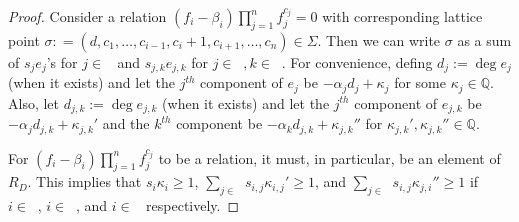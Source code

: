 \documentclass{amsart}
\theoremstyle{plain}
\theoremstyle{definition}
\theoremstyle{remark}
\numberwithin{equation}{section}
\newcommand\bq{{\mathbb Q}}
\newcommand\bz{{\mathbb Z}}
\newcommand\bida{a}
\newcommand\bidb{b}
\DeclareMathOperator{\Te}{T_=}
\DeclareMathOperator{\Tp}{T_+}
\DeclareMathOperator{\Tm}{T_-}
\begin{document}
\begin{proof}

Consider a relation $(f_i - \beta_i)\prod_{j=1}^n f_j^{c_j}=0$ with corresponding lattice point $\sigma: = (d, c_1, \ldots, c_{i-1}, c_{i}+1, c_{i+1}, \ldots, c_n) \in \Sigma$.
Then we can write $\sigma$ as a sum of $s_j e_j$'s for $j\in
\Te$ and $s_{j,k}e_{j,k}$ for $j\in \Tp, k\in \Tm$.  
For convenience, defing $d_j := \deg e_j$ (when it exists) and let the $j^{th}$
component of $e_j$ be $-\alpha_j d_j + \kappa_j$ for some $\kappa_j \in \bq$. Also, let $d_{j,k} := \deg e_{j,k}$ (when it exists) and let the $j^{th}$ component of $e_{j,k}$ be $-\alpha_j d_{j,k} + \kappa_{j,k}'$ and the $k^{th}$
component be $-\alpha_k d_{j,k} + \kappa_{j,k}''$ for $\kappa_{j,k}', \kappa_{j,k}'' \in \bq$.

For $(f_i - \beta_i)\prod_{j=1}^n f_j^{c_j}$ to be a relation, it must, in particular, be an element of $R_D$. This implies that $s_i\kappa_i\ge 1$, $\sum_{j\in \Tm} s_{i,j}\kappa_{i,j}' \ge 1$, and $\sum_{j\in \Tp} s_{i,j}\kappa_{j,i}'' \ge 1$ if $i\in \Te$, $i\in \Tp$, and $i\in \Tm$ respectively.


\end{proof}
\end{document}
